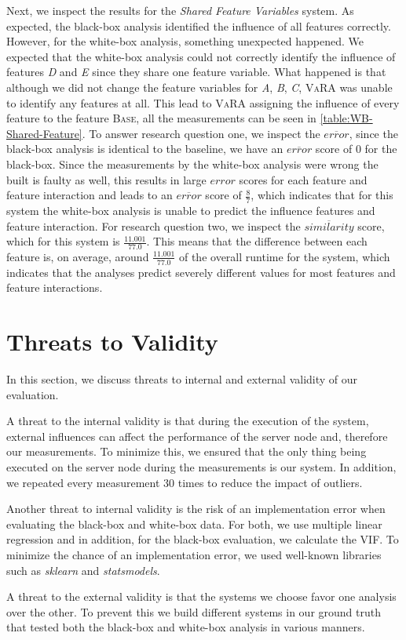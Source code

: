 Next, we inspect the results for the \emph{Shared Feature Variables} system. 
As expected, the black-box analysis identified the influence of all features correctly. 
However, for the white-box analysis, something unexpected happened. 
We expected that the white-box analysis could not correctly identify the influence of features \emph{D} and \emph{E} since they share one 
feature variable. What happened is that although we did not change the feature variables for \emph{A}, \emph{B}, \emph{C}, \textsc{VaRA} 
was unable to identify any features at all. This lead to \textsc{VaRA} assigning the influence of every feature to the feature \textsc{Base},
all the measurements can be seen in \autoref{table:WB-Shared-Feature}.
To answer research question one, we inspect the $\overline{error}$, since the black-box analysis is identical to the baseline, we have an 
$\overline{error}$ score of $0$ for the black-box. Since the measurements by the white-box analysis were wrong the {\perfInfluenceModel} built
is faulty as well, this results in large $error$ scores for each feature and feature interaction and leads to an $\overline{error}$ score
of $\frac{8}{7}$, which indicates that for this system the white-box analysis is unable to predict the influence features and feature interaction.
For research question two, we inspect the $\overline{similarity}$ score, which for this system is $\frac{11.001}{77.0}$.
This means that the difference between each feature is, on average, around $\frac{11.001}{77.0}$ of the overall runtime for the system,
which indicates that the analyses predict severely different values for most features and feature interactions.

\section{Threats to Validity}\label{sec:threats}

In this section, we discuss threats to internal and external validity of our evaluation.

A threat to the internal validity is that during the execution of the system, 
external influences can affect the performance of the server node and, therefore our measurements. 
To minimize this, we ensured that the only thing being executed on the server node during the measurements is our system. 
In addition, we repeated every measurement $30$ times to reduce the impact of outliers.  

Another threat to internal validity is the risk of an implementation error when evaluating the black-box and white-box data.
For both, we use multiple linear regression and in addition, for the black-box evaluation, we calculate the VIF.
To minimize the chance of an implementation error, we used well-known libraries such as \emph{sklearn} and \emph{statsmodels}.

A threat to the external validity is that the systems we choose favor one analysis over the other. 
To prevent this we build different systems in our ground truth that tested both the black-box and white-box analysis 
in various manners.